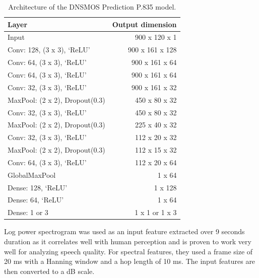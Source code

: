 \begin{table}[ht]
    \centering
    \begin{tabular}{|l|r|}
        \hline
        \textbf{Layer}                 & \textbf{Output dimension} \\
        \hline
        Input                          & 900 x 120 x 1             \\
        \hline
        Conv: 128, (3 x 3), ‘ReLU’     & 900 x 161 x 128           \\
        Conv: 64, (3 x 3), ‘ReLU’      & 900 x 161 x 64            \\
        Conv: 64, (3 x 3), ‘ReLU’      & 900 x 161 x 64            \\
        Conv: 32, (3 x 3), ‘ReLU’      & 900 x 161 x 32            \\
        MaxPool: (2 x 2), Dropout(0.3) & 450 x 80 x 32             \\
        \hline
        Conv: 32, (3 x 3), ‘ReLU’      & 450 x 80 x 32             \\
        MaxPool: (2 x 2), Dropout(0.3) & 225 x 40 x 32             \\
        \hline
        Conv: 32, (3 x 3), ‘ReLU’      & 112 x 20 x 32             \\
        MaxPool: (2 x 2), Dropout(0.3) & 112 x 15 x 32             \\
        \hline
        Conv: 64, (3 x 3), ‘ReLU’      & 112 x 20 x 64             \\
        GlobalMaxPool                  & 1 x 64                    \\
        \hline
        Dense: 128, ‘ReLU’             & 1 x 128                   \\
        Dense: 64, ‘ReLU’              & 1 x 64                    \\
        Dense: 1 or 3                  & 1 x 1 or 1 x 3            \\
        \hline
    \end{tabular}
    \caption{Architecture of the DNSMOS Prediction P.835 model.}
    \label{tab:dnnmos-835-architecture}
\end{table}

Log power spectrogram was used as an input feature extracted over 9 seconds duration as it correlates well with human perception and is proven to work very well for analyzing speech quality.  For spectral features, they used a frame size of 20 ms with a Hanning window and a hop length of 10 ms. The input features are then converted to a dB scale.

